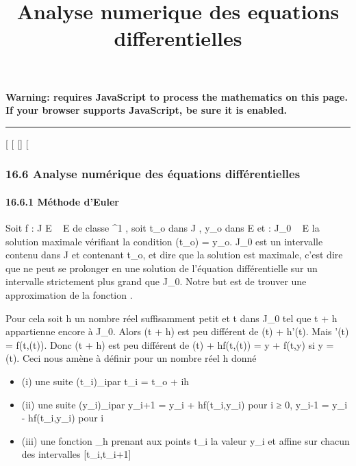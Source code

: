 \documentclass[]{article}
\title{Analyse numerique des equations differentielles}
\author{}
\date{}
\begin{document}
\maketitle

\textbf{Warning: 
requires JavaScript to process the mathematics on this page.\\ If your
browser supports JavaScript, be sure it is enabled.}

\begin{center}\rule{3in}{0.4pt}\end{center}

{[}
{[}
{[}{]}
{[}

\subsubsection{16.6 Analyse numérique des équations différentielles}

\paragraph{16.6.1 Méthode d'Euler}

Soit f : J \times E \rightarrow~ E de classe ^1 , soit t\_o dans J ,
y\_o dans E et \phi : J\_0 \rightarrow~ E la solution maximale
vérifiant la condition \phi(t\_o) = y\_o. J\_0 est
un intervalle contenu dans J et contenant t\_o, et dire que la
solution est maximale, c'est dire que \phi ne peut se prolonger en une
solution de l'équation différentielle sur un intervalle strictement plus
grand que J\_0. Notre but est de trouver une approximation de la
fonction \phi .

Pour cela soit h un nombre réel suffisamment petit et t dans
J\_0 tel que t + h appartienne encore à J\_0. Alors \phi(t
+ h) est peu différent de \phi(t) + h\phi'(t). Mais \phi'(t) = f(t,\phi(t)). Donc
\phi(t + h) est peu différent de \phi(t) + hf(t,\phi(t)) = y + f(t,y) si y =
\phi(t). Ceci nous amène à définir pour un nombre réel h donné

\begin{itemize}
\itemsep1pt\parskip0pt
\item
  (i) une suite (t\_i)\_i par t\_i =
  t\_o + ih
\item
  (ii) une suite (y\_i)\_i par y\_i+1 =
  y\_i + hf(t\_i,y\_i) pour i ≥ 0,
  y\_i-1 = y\_i - hf(t\_i,y\_i) pour i 
\item
  (iii) une fonction \phi\_h prenant aux points t\_i la
  valeur y\_i et affine sur chacun des intervalles
  {[}t\_i,t\_i+1{]}
\end{itemize}
\end{document}
